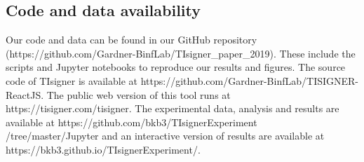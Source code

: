 \subsection{Code and data availability}
Our code and data can be found in our GitHub repository (https://github.com/Gardner-BinfLab/TIsigner\_paper\_2019). These include the scripts and Jupyter notebooks to reproduce our results and figures. The source code of TIsigner is available at https://github.com/Gardner-BinfLab/TISIGNER-ReactJS. The public web version of this tool runs at https://tisigner.com/tisigner. The experimental data, analysis and results are available at https://github.com/bkb3/TIsignerExperiment\\/tree/master/Jupyter and an interactive version of results are available at \\https://bkb3.github.io/TIsignerExperiment/.

